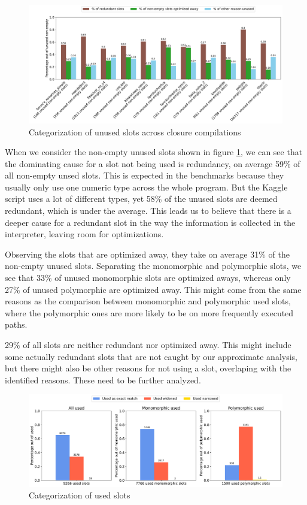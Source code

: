 \begin{figure}[t]
	\centering
	\begin{adjustwidth}{-3cm}{-3cm}
		\includegraphics[width=1.5\textwidth]{figures/unused.pdf}
	\end{adjustwidth}
	\caption{Categorization of unused slots across closure compilations}\label{fig:graph-unused}
\end{figure}

When we consider the non-empty unused slots shown in figure \ref{fig:graph-unused}, we can see that the dominating cause for a slot not being used is redundancy, on average 59\% of all non-empty unsed slots. This is expected in the benchmarks because they usually only use one numeric type across the whole program. But the Kaggle script uses a lot of different types, yet 58\% of the unused slots are deemed redundant, which is under the average. This leads us to believe that there is a deeper cause for a redundant slot in the way the information is collected in the interpreter, leaving room for optimizations.

Observing the slots that are optimized away, they take on average 31\% of the non-empty unused slots. Separating the monomorphic and polymorphic slots, we see that 33\% of unused monomorphic slots are optimized aways, whereas only 27\% of unused polymorphic are optimized away. This might come from the same reasons as the comparison between monomorphic and polymorphic used slots, where the polymorphic ones are more likely to be on more frequently executed paths.

29\% of all slots are neither redundant nor optimized away. This might include some actually redundant slots that are not caught by our approximate analysis, but there might also be other reasons for not using a slot, overlaping with the identified reasons. These need to be further analyzed.

\begin{figure}[t]
	\centering
	\includegraphics[width=\textwidth]{figures/used_all.pdf}
	\caption{Categorization of used slots}\label{fig:graph-used}
\end{figure}

